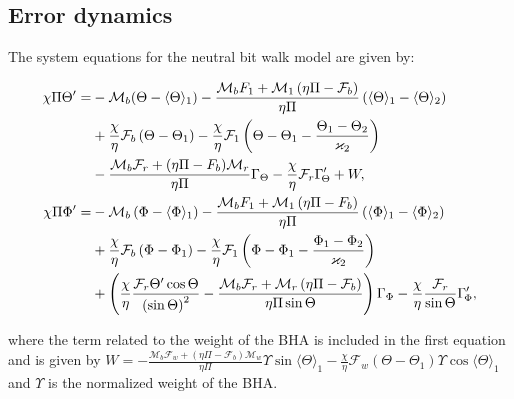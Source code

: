 \documentclass[main.tex]{subfiles}
\begin{document}
	
	
	\subsection{Error dynamics}
	
	The system equations for the neutral bit walk model are given by:
	
	\begin{equation}
	\begin{aligned}
	\chi \Pi \Theta ' =  &- \mathcal{M}_b(\Theta-\langle\Theta \rangle_1)-\frac{{{\mathcal{M}_b}{F_1} + {\mathcal{M}_1}\left( {\eta \Pi  - {\mathcal{F}_b}} \right)}}{{\eta \Pi }}\left( {{\langle{\rm{\Theta }} \rangle_1} - {\langle{\rm{\Theta }} \rangle_{2}}} \right)
	\\
	&+\frac{\chi }{\eta }{\mathcal{F}_b}\left( {{\rm{\Theta }} - {{\rm{\Theta }}_1}} \right)
	- \frac{\chi }{\eta }{\mathcal{F}_1}\left( {{{{{\rm{\Theta }}} - {{\rm{\Theta }}_1}}} - \frac{{{{\rm{\Theta }}_1} - {{\rm{\Theta }}_{2}}}}{{{\varkappa _{2}}}}} \right)
	\\
	&- \frac{{{\mathcal{M}_b}{\mathcal{F}_r} + (\eta \Pi  - {F_b}){\mathcal{M}_r}}}{{\eta \Pi }}{\Gamma _{\Theta}} - \frac{\chi }{\eta }{\mathcal{F}_r}\Gamma_{\!\Theta}' + W,
	\\
	\chi \Pi \Phi ' =  &- {\mathcal{M}_b}\left( {\Phi  - {\langle{\rm{\Phi }} \rangle_1}} \right)-\frac{{{\mathcal{M}_b}{F_1} + {\mathcal{M}_1}\left( {\eta \Pi  - {F_b}} \right)}}{{\eta \Pi }}\left( {{\langle{\rm{\Phi }} \rangle_1} - {\langle{\rm{\Phi }} \rangle_{2}}} \right)
	\\
	&+\frac{\chi }{\eta }{\mathcal{F}_b}\left( {{\rm{\Phi }} - {{\rm{\Phi }}_1}} \right)
	- \frac{\chi }{\eta }{\mathcal{F}_1}\left( {{{{{\rm{\Phi }}} - {{\rm{\Phi }}_1}}} - \frac{{{{\rm{\Phi }}_1} - {{\rm{\Phi }}_{2}}}}{{{\varkappa _{2}}}}} \right)
	\\
	&+ \left( {\frac{\chi }{\eta }\frac{{{\mathcal{F}_r}\Theta '\cos \Theta }}{{{{\left( {\sin \Theta } \right)}^2}}} - \frac{{{\mathcal{M}_b}{\mathcal{F}_r} + {\mathcal{M}_r}\left( {\eta \Pi  - {\mathcal{F}_b}} \right)}}{{\eta \Pi \sin \Theta }}} \right){\Gamma _{\Phi}} - \frac{\chi }{\eta }\frac{{{\mathcal{F}_r}}}{{\sin \Theta }}\Gamma_{\!\Phi}',
	\end{aligned}
	\label{eq:neutralbitwalkmodelfordesign}
	\end{equation}
	
	
	where the term related to the weight of the BHA is included in the first equation and is given by $W = -\frac{\mathcal{M}_b \mathcal{F}_w + (\eta \Pi - \mathcal{F}_b)\mathcal{M}_w}{\eta \Pi}\Upsilon \sin \langle\Theta\rangle_1 -\frac{\chi}{\eta}\mathcal{F}_w (\Theta - \Theta_1)\Upsilon \cos \langle\Theta\rangle_1$ and $\Upsilon$ is the normalized weight of the BHA.
	
\end{document}
